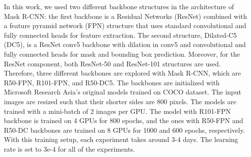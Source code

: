 \documentclass[letterpaper]{article} %
\begin{document}
In this work, we used two different backbone structures in the architecture of Mask R-CNN: the first backbone is a Residual Networks (ResNet) combined with a feature pyramid network (FPN) structure that uses standard convolutional and fully connected heads for feature extraction. The second structure, Dilated-C5 (DC5), is a ResNet conv5 backbone with dilation in conv5 and convolutional and fully connected heads for mask and bounding box prediction.
Moreover, for the ResNet component, both ResNet-50 and ResNet-101 structures are used. Therefore, three different backbones are explored with Mask R-CNN, 
which are R50-FPN, R101-FPN, and R50-DC5. The backbones are initialized with Microsoft Research Asia's original models trained on COCO \cite{DBLP:conf/eccv/LinMBHPRDZ14} dataset. 
The input images are resized such that their shorter sides are 800 pixels. The models are trained with a mini-batch of 2 images per GPU. The model with R101-FPN backbone is trained on 4 GPUs for 800 epochs, and the ones with R50-FPN and R50-DC backbones are trained on 8 GPUs for 1000 and 600 epochs, respectively. With this training setup, each experiment takes around 3-4 days. The learning rate is set to 3e-4 for all of the experiments. 

\end{document}
